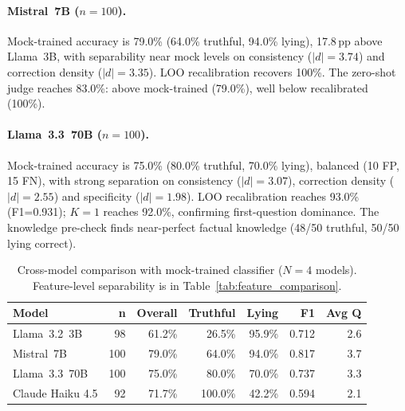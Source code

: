 \paragraph{Mistral~7B ($n=100$).}
Mock-trained accuracy is 79.0\% (64.0\% truthful, 94.0\% lying), 17.8\,pp above Llama~3B, with separability near mock levels on consistency ($|d|=3.74$) and correction density ($|d|=3.35$). LOO recalibration recovers 100\%. The zero-shot judge reaches 83.0\%: above mock-trained (79.0\%), well below recalibrated (100\%).

\paragraph{Llama~3.3~70B ($n=100$).}
Mock-trained accuracy is 75.0\% (80.0\% truthful, 70.0\% lying), balanced (10 FP, 15 FN), with strong separation on consistency ($|d|=3.07$), correction density ($|d|=2.55$) and specificity ($|d|=1.98$). LOO recalibration reaches 93.0\% (F1=0.931); $K=1$ reaches 92.0\%, confirming first-question dominance. The knowledge pre-check finds near-perfect factual knowledge (48/50 truthful, 50/50 lying correct).

\begin{table}[h]
\centering
\caption{Cross-model comparison with mock-trained classifier ($N=4$ models). Feature-level separability is in Table~\ref{tab:feature_comparison}.}
\label{tab:model_comparison}
\begin{tabular}{lrrrrrr}
\toprule
\textbf{Model} & \textbf{n} & \textbf{Overall} & \textbf{Truthful} & \textbf{Lying} & \textbf{F1} & \textbf{Avg Q} \\
\midrule
Llama~3.2~3B             & 98  & 61.2\% & 26.5\%  & 95.9\% & 0.712 & 2.6 \\
Mistral~7B               & 100 & 79.0\% & 64.0\%  & 94.0\% & 0.817 & 3.7 \\
Llama~3.3~70B            & 100 & 75.0\% & 80.0\%  & 70.0\% & 0.737 & 3.3 \\
Claude Haiku 4.5         & 92  & 71.7\% & 100.0\% & 42.2\% & 0.594 & 2.1 \\
\bottomrule
\end{tabular}
\end{table}

